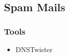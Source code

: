 \subsection{Spam Mails}
\subsubsection{Tools}
\begin{itemize}
    \item DNSTwister
\end{itemize}



